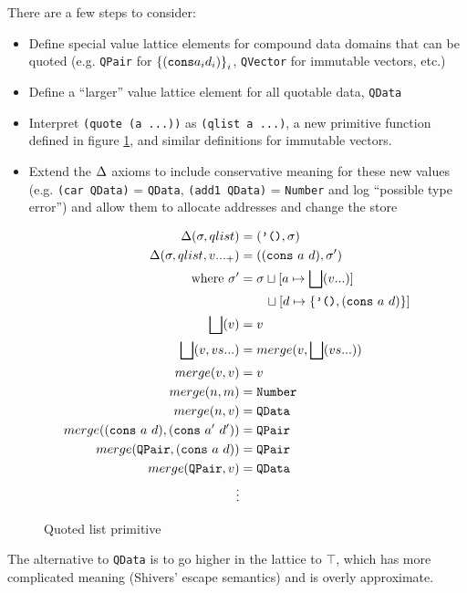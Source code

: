 \documentclass[preprint,onecolumn,9pt]{sigplanconf} %
\begin{document}
There are a few steps to consider:
\begin{itemize}
 \item{Define special value lattice elements for compound data domains that can be quoted
       (e.g. {\tt QPair} for $\left\{ ({\tt cons} a_i d_i)\right\}_i$, {\tt QVector} for immutable vectors, etc.)}
 \item{Define a ``larger'' value lattice element for all quotable data, {\tt QData}}
 \item{Interpret {\tt (quote (a ...))} as {\tt (qlist a ...)}, a new primitive function defined in figure \ref{fig:qlist},
       and similar definitions for immutable vectors.}
 \item{Extend the $\Delta$ axioms to include conservative meaning for these new values (e.g. {\tt (car QData)} = {\tt QData}, {\tt (add1 QData)} = {\tt Number} and log ``possible type error'') and allow them to allocate addresses and change the store}
\end{itemize}

\begin{figure}
\begin{align*}
\Delta(\sigma, qlist) &= (\mbox{{\tt '()}}, \sigma) \\
\Delta(\sigma, qlist, v ..._+) &= (({\tt cons}\ a\ d), \sigma') \\
\qquad \mbox{where } \sigma' &= \sigma\sqcup[a \mapsto \bigsqcup(v ...)] \\
                            &\qquad \sqcup[d \mapsto \{ \mbox{{\tt '()}}, ({\tt cons}\ a\ d)\}] \\
\bigsqcup(v) &= v \\
\bigsqcup(v, vs ...) &= merge(v, \bigsqcup(vs ...)) \\
merge(v, v) &= v \\
merge(n, m) &= {\tt Number} \\
merge(n, v) &= {\tt QData} \\
merge(({\tt cons}\ a\ d), ({\tt cons}\ a'\ d')) &= {\tt QPair} \\
merge({\tt QPair}, ({\tt cons}\ a\ d)) &= {\tt QPair} \\
merge({\tt QPair}, v) &= {\tt QData} \\
\vdots
\end{align*}
\caption{Quoted list primitive}
\label{fig:qlist}
\end{figure}

The alternative to {\tt QData} is to go higher in the lattice to
$\top$, which has more complicated meaning (Shivers' escape semantics) and
is overly approximate.
\end{document}
